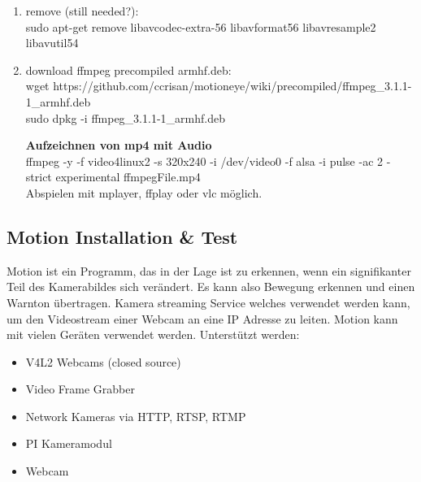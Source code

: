 \begin{enumerate}
	\item remove (still needed?):\\
	sudo apt-get remove libavcodec-extra-56 libavformat56 libavresample2 libavutil54
	\item download ffmpeg precompiled armhf.deb:\\
	wget https://github.com/ccrisan/motioneye/wiki/precompiled/ffmpeg\_3.1.1-1\_armhf.deb\\
	sudo dpkg -i ffmpeg\_3.1.1-1\_armhf.deb
	
\textbf{Aufzeichnen von mp4 mit Audio}\\
ffmpeg -y -f video4linux2 -s 320x240 -i /dev/video0 -f alsa -i pulse -ac 2 -strict experimental ffmpegFile.mp4\\
Abspielen mit mplayer, ffplay oder vlc möglich.

\end{enumerate}

\subsection{Motion Installation \& Test}

Motion ist ein Programm, das in der Lage ist zu erkennen, wenn ein signifikanter Teil des Kamerabildes sich verändert. Es kann also 
Bewegung erkennen und einen Warnton übertragen. Kamera streaming 
Service welches verwendet werden kann, um den Videostream 
einer Webcam an eine IP Adresse zu leiten. Motion kann mit 
vielen Geräten verwendet werden. Unterstützt werden:
\begin{itemize}
\item V4L2 Webcams (closed source)
\item Video Frame Grabber
\item Network Kameras via HTTP, RTSP, RTMP
\item PI Kameramodul
\item Webcam
\end{itemize}

